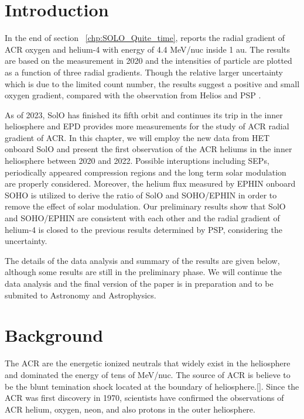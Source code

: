 
\section{Introduction}

In the end of section ~\ref{chp:SOLO_Quite_time}, \citet{Mason-2021-SolOQuietTime} reports the radial gradient of \ac{ACR} oxygen and helium-4 with energy of 4.4 MeV/nuc inside 1 au. The results are based on the measurement in 2020 and the intensities of particle are plotted as a function of three radial gradients. Though the relative larger uncertainty which is due to the limited count number, the results suggest a positive and small oxygen gradient, compared with the observation from Helios and \ac{PSP} \citep{Rankin2021ApJ,Marquardt2018AA}.

As of 2023, \ac{SolO} has finished its fifth orbit and continues its trip in the inner heliosphere and \ac{EPD} provides more measurements for the study of \ac{ACR} radial gradient of \ac{ACR}. 
In this chapter, we will employ the new data from \ac{HET} onboard \ac{SolO} and present the first observation of the \ac{ACR} heliums in the inner heliosphere between 2020 and 2022. Possible interuptions including \acp{SEP}, periodically appeared compression regions and the long term solar modulation are properly considered. Moreover, the helium flux measured by \ac{EPHIN} onboard \ac{SOHO} is utilized to derive the ratio of \ac{SolO} and \ac{SOHO}/\ac{EPHIN} in order to remove the effect of solar modulation. Our preliminary results show that \ac{SolO} and \ac{SOHO}/\ac{EPHIN} are consistent with each other and the radial gradient of helium-4 is closed to the previous results determined by \ac{PSP}, considering the uncertainty.

The details of the data analysis and summary of the results are given below, although some results are still in the preliminary phase. We will continue the data analysis and the final version of the paper is in preparation and to be submited to Astronomy and Astrophysics.


\section{Background}

The \ac{ACR} are the energetic ionized neutrals that widely exist in the heliosphere and dominated the energy of tens of MeV/nuc. The source of \ac{ACR} is believe to be the blunt temination shock located at the boundary of heliosphere.[\citation]. Since the \ac{ACR} was first discovery in 1970, scientists have confirmed the observations of \ac{ACR} helium, oxygen, neon, and also protons in the outer heliosphere. 

